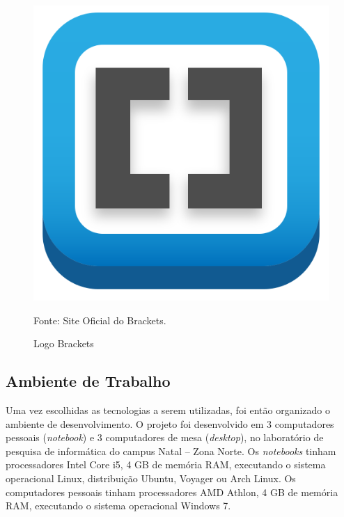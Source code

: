 \begin{figure}[!htb]
	\centering
	\includegraphics[scale=0.05
	]{imagens/brackets_logo}
	\caption{Logo Brackets}
	Fonte: Site Oficial do Brackets.
	\label{Rotulo}
\end{figure}

\subsection{Ambiente de Trabalho}
Uma vez escolhidas as tecnologias a serem utilizadas, foi então organizado o ambiente de desenvolvimento. O projeto foi desenvolvido em 3 computadores pessoais ({\it notebook}) e 3 computadores de mesa ({\it desktop}), no laboratório de pesquisa de informática do campus Natal – Zona Norte. Os {\it notebooks} tinham processadores Intel Core i5, 4 GB de memória RAM, executando o sistema operacional Linux, distribuição Ubuntu, Voyager ou Arch Linux. Os computadores pessoais tinham processadores AMD Athlon, 4 GB de memória RAM, executando o sistema operacional Windows 7.	

